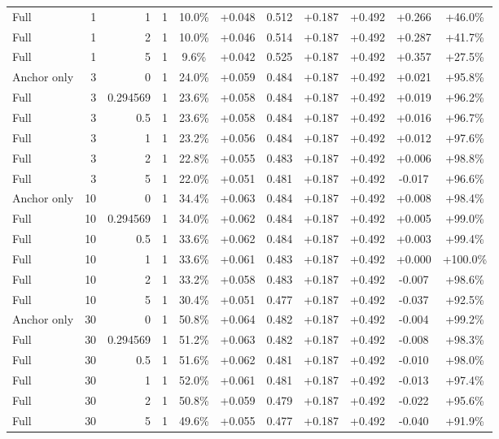 \begin{table}[htbp]
\begin{tabular}{lrrrccccccc}
Full & 1 & 1 & 1 & 10.0\% & +0.048 & 0.512 & +0.187 & +0.492 & +0.266 & +46.0\% \\
Full & 1 & 2 & 1 & 10.0\% & +0.046 & 0.514 & +0.187 & +0.492 & +0.287 & +41.7\% \\
Full & 1 & 5 & 1 & 9.6\% & +0.042 & 0.525 & +0.187 & +0.492 & +0.357 & +27.5\% \\
Anchor only & 3 & 0 & 1 & 24.0\% & +0.059 & 0.484 & +0.187 & +0.492 & +0.021 & +95.8\% \\
Full & 3 & 0.294569 & 1 & 23.6\% & +0.058 & 0.484 & +0.187 & +0.492 & +0.019 & +96.2\% \\
Full & 3 & 0.5 & 1 & 23.6\% & +0.058 & 0.484 & +0.187 & +0.492 & +0.016 & +96.7\% \\
Full & 3 & 1 & 1 & 23.2\% & +0.056 & 0.484 & +0.187 & +0.492 & +0.012 & +97.6\% \\
Full & 3 & 2 & 1 & 22.8\% & +0.055 & 0.483 & +0.187 & +0.492 & +0.006 & +98.8\% \\
Full & 3 & 5 & 1 & 22.0\% & +0.051 & 0.481 & +0.187 & +0.492 & -0.017 & +96.6\% \\
Anchor only & 10 & 0 & 1 & 34.4\% & +0.063 & 0.484 & +0.187 & +0.492 & +0.008 & +98.4\% \\
Full & 10 & 0.294569 & 1 & 34.0\% & +0.062 & 0.484 & +0.187 & +0.492 & +0.005 & +99.0\% \\
Full & 10 & 0.5 & 1 & 33.6\% & +0.062 & 0.484 & +0.187 & +0.492 & +0.003 & +99.4\% \\
Full & 10 & 1 & 1 & 33.6\% & +0.061 & 0.483 & +0.187 & +0.492 & +0.000 & +100.0\% \\
Full & 10 & 2 & 1 & 33.2\% & +0.058 & 0.483 & +0.187 & +0.492 & -0.007 & +98.6\% \\
Full & 10 & 5 & 1 & 30.4\% & +0.051 & 0.477 & +0.187 & +0.492 & -0.037 & +92.5\% \\
Anchor only & 30 & 0 & 1 & 50.8\% & +0.064 & 0.482 & +0.187 & +0.492 & -0.004 & +99.2\% \\
Full & 30 & 0.294569 & 1 & 51.2\% & +0.063 & 0.482 & +0.187 & +0.492 & -0.008 & +98.3\% \\
Full & 30 & 0.5 & 1 & 51.6\% & +0.062 & 0.481 & +0.187 & +0.492 & -0.010 & +98.0\% \\
Full & 30 & 1 & 1 & 52.0\% & +0.061 & 0.481 & +0.187 & +0.492 & -0.013 & +97.4\% \\
Full & 30 & 2 & 1 & 50.8\% & +0.059 & 0.479 & +0.187 & +0.492 & -0.022 & +95.6\% \\
Full & 30 & 5 & 1 & 49.6\% & +0.055 & 0.477 & +0.187 & +0.492 & -0.040 & +91.9\% \\

\end{tabular}
\end{table}
